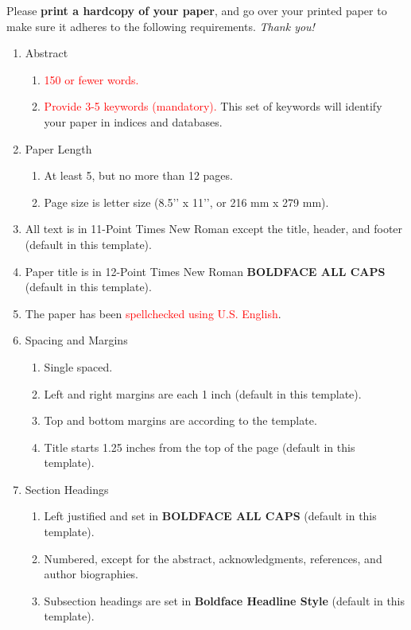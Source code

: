 \documentclass{scspaperproc}
\theoremstyle{scsthe}
\begin{document}
Please \textbf{print a hardcopy of your paper}, and go over your printed paper to make sure it adheres to the following requirements. \textit{Thank you!}

\begin{enumerate}
	\item Abstract
  \begin{enumerate}
	  \item \textcolor{red}{150 or fewer words.}
	  \item \textcolor{red}{Provide 3-5 keywords (mandatory).} This set of keywords will identify your paper in indices and databases.
	\end{enumerate}
	\item Paper Length
  \begin{enumerate}
	  \item At least 5, but no more than 12 pages.
	  \item Page size is letter size (8.5’’ x 11’’, or 216 mm x 279 mm).
	\end{enumerate}
	\item All text is in 11-Point Times New Roman except the title, header, and footer (default in this template).
	\item Paper title is in 12-Point Times New Roman \textbf{BOLDFACE ALL CAPS} (default in this template).
	\item The paper has been \textcolor{red}{spellchecked using U.S. English}. 
	\item Spacing and Margins
  \begin{enumerate}
	  \item Single spaced.
	  \item Left and right margins are each 1 inch (default in this template).
	  \item Top and bottom margins are according to the template.
	  \item Title starts 1.25 inches from the top of the page (default in this template).
	\end{enumerate}
	\item Section Headings
  \begin{enumerate}
	  \item Left justified and set in \textbf{BOLDFACE ALL CAPS} (default in this template).
	  \item Numbered, except for the abstract, acknowledgments, references, and author biographies.
	  \item Subsection headings are set in \textbf{Boldface Headline Style} (default in this template).
	\end{enumerate}

\end{enumerate}
\end{document}
